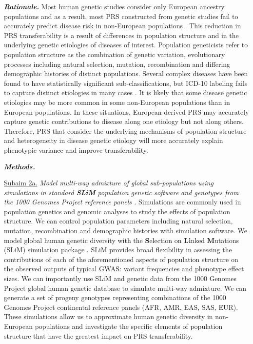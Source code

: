 \documentclass[11pt]{article}  %
\newlength\tindent
\renewcommand{\indent}{\hspace*{\tindent}}
\begin{document}
\indent \textbf{\textit{Rationale.}} Most human genetic studies consider only European ancestry populations and as a result, most PRS constructed from genetic studies fail to accurately predict disease risk in non-European populations \cite{wojcik_genetic_2019}. This reduction in PRS transferability is a result of differences in population structure and in the underlying genetic etiologies of diseases of interest. Population geneticists refer to population structure as the combination of genetic variation, evolutionary processes including natural selection, mutation, recombination and differing demographic histories of distinct populations. Several complex diseases have been found to have statistically significant sub-classifications, but ICD-10 labeling fails to capture distinct etiologies in many cases \cite{weiner_point_2018, cox_good_2009}. It is likely that some disease genetic etiologies may be more common in some non-European populations than in European populations. In these situations, European-derived PRS may accurately capture genetic contributions to disease along one etiology but not along others. Therefore, PRS that consider the underlying mechanisms of population structure and heterogeneity in disease genetic etiology will more accurately explain phenotypic variance and improve transferability.         


\indent \textbf{\textit{Methods.}} 

\indent \underline{Subaim 2a.} \textit{Model multi-way admixture of global sub-populations using simulations in standard \textbf{SLiM} population genetic software \cite{haller_slim_2019} and genotypes from the 1000 Genomes Project reference panels \cite{noauthor_global_2015}.} Simulations are commonly used in population genetics and genomic analyses to study the effects of population structure. We can control population parameters including natural selection, mutation, recombination and demographic histories with simulation software. We model global human genetic diversity with the \textbf{S}election on \textbf{Li}nked \textbf{M}utations (SLiM) simulation package \cite{haller_slim_2019}. SLiM provides broad flexibility in assessing the contributions of each of the aforementioned aspects of population structure on the observed outputs of typical GWAS: variant frequencies and phenotype effect sizes. We can importantly use SLiM and genetic data from the 1000 Genomes Project \cite{noauthor_global_2015} global human genetic database to simulate multi-way admixture. We can generate a set of progeny genotypes representing combinations of the 1000 Genomes Project continental reference panels (AFR, AMR, EAS, SAS, EUR). These simulations allow us to approximate human genetic diversity in non-European populations and investigate the specific elements of population structure that have the greatest impact on PRS transferability.
\end{document}
